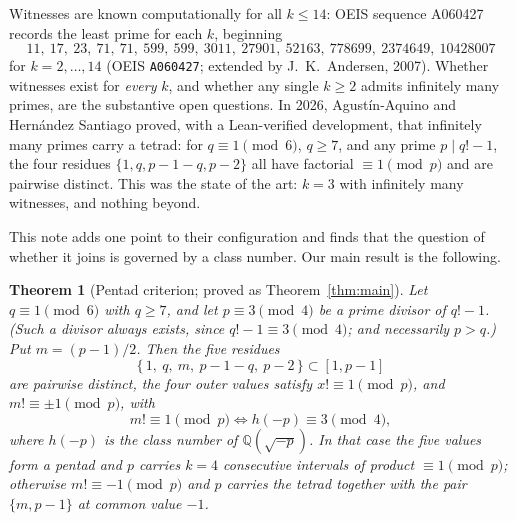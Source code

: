 \documentclass[11pt]{article}
\newtheorem{theorem}{Theorem}[section]
\theoremstyle{definition}
\theoremstyle{remark}
\newcommand{\Q}{\mathbb{Q}}
\begin{document}
Witnesses are known computationally for all $k \le 14$: OEIS sequence
A060427 \cite{OEIS} records the least prime for each $k$, beginning
\[
  11,\ 17,\ 23,\ 71,\ 71,\ 599,\ 599,\ 3011,\ 27901,\ 52163,\ 778699,\
  2374649,\ 10428007
\]
for $k = 2, \dots, 14$ (OEIS \texttt{A060427}; extended by
J.~K.~Andersen, 2007). Whether witnesses exist for
\emph{every} $k$, and whether any single $k \ge 2$ admits infinitely many
primes, are the substantive open questions. In 2026, Agust\'in-Aquino and
Hern\'andez Santiago \cite{AAHS} proved, with a Lean-verified development,
that infinitely many primes carry a tetrad: for $q \equiv 1 \pmod 6$,
$q \ge 7$, and any prime $p \mid q!-1$, the four residues
$\{1, q, p-1-q, p-2\}$ all have factorial $\equiv 1 \pmod p$ and are pairwise
distinct. This was the state of the art: $k = 3$ with infinitely many
witnesses, and nothing beyond.

This note adds one point to their configuration and finds that the question
of whether it joins is governed by a class number. Our main result is the
following.

\begin{theorem}[Pentad criterion; proved as Theorem~\ref{thm:main}]
Let $q \equiv 1 \pmod 6$ with $q \ge 7$, and let $p \equiv 3 \pmod 4$ be a
prime divisor of $q!-1$. (Such a divisor always exists, since
$q!-1 \equiv 3 \pmod 4$; and necessarily $p > q$.) Put $m = (p-1)/2$. Then
the five residues
\[
  \{\,1,\ q,\ m,\ p-1-q,\ p-2\,\} \subset [1, p-1]
\]
are pairwise distinct, the four outer values satisfy
$x! \equiv 1 \pmod p$, and $m! \equiv \pm 1 \pmod p$, with
\[
  m! \equiv 1 \pmod p
  \iff
  h(-p) \equiv 3 \pmod 4,
\]
where $h(-p)$ is the class number of $\Q(\sqrt{-p})$. In that case the five
values form a pentad and $p$ carries $k = 4$ consecutive intervals of product
$\equiv 1 \pmod p$; otherwise $m! \equiv -1 \pmod p$ and $p$ carries the
tetrad together with the pair $\{m, p-1\}$ at common value $-1$.
\end{theorem}
\end{document}
